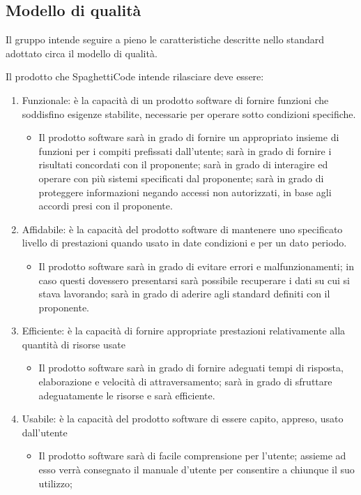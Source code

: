 \documentclass[../piano_di_qualifica.tex]{subfiles}
\begin{document}
\subsection{Modello di qualità}
Il gruppo intende seguire a pieno le caratteristiche descritte nello standard adottato circa il modello di qualità.\par
Il prodotto che SpaghettiCode intende rilasciare deve essere:\par
\begin{enumerate}
\item Funzionale: è la capacità di un prodotto software di fornire funzioni che soddisfino esigenze stabilite, necessarie per operare sotto condizioni specifiche.
	\begin{itemize}
	\item Il prodotto software sarà in grado di fornire un appropriato insieme di funzioni per i compiti prefissati dall’utente; sarà in grado di fornire i risultati concordati con il proponente; sarà in grado di interagire ed operare con più sistemi specificati dal proponente; sarà in grado di proteggere informazioni negando accessi non autorizzati, in base agli accordi presi con il proponente.
	\end{itemize}
\item Affidabile: è la capacità del prodotto software di mantenere uno specificato livello di prestazioni quando usato in date condizioni e per un dato periodo.
	\begin{itemize}
	\item Il prodotto software sarà in grado di evitare errori e malfunzionamenti; in caso questi dovessero presentarsi sarà possibile recuperare i dati su cui si stava lavorando; sarà in grado di aderire agli standard definiti con il proponente.
	\end{itemize}
\item Efficiente: è la capacità di fornire appropriate prestazioni relativamente alla quantità di risorse usate
	\begin{itemize}
	\item Il prodotto software sarà in grado di fornire adeguati tempi di risposta, elaborazione e velocità di attraversamento; sarà in grado di sfruttare adeguatamente le risorse e sarà efficiente.
	\end{itemize}
\item Usabile: è la capacità del prodotto software di essere capito, appreso, usato dall'utente
	\begin{itemize}
	\item Il prodotto software sarà di facile comprensione per l’utente; assieme ad esso verrà consegnato il manuale d’utente per consentire a chiunque il suo utilizzo; 

\end{itemize}
\end{enumerate}
\end{document}
